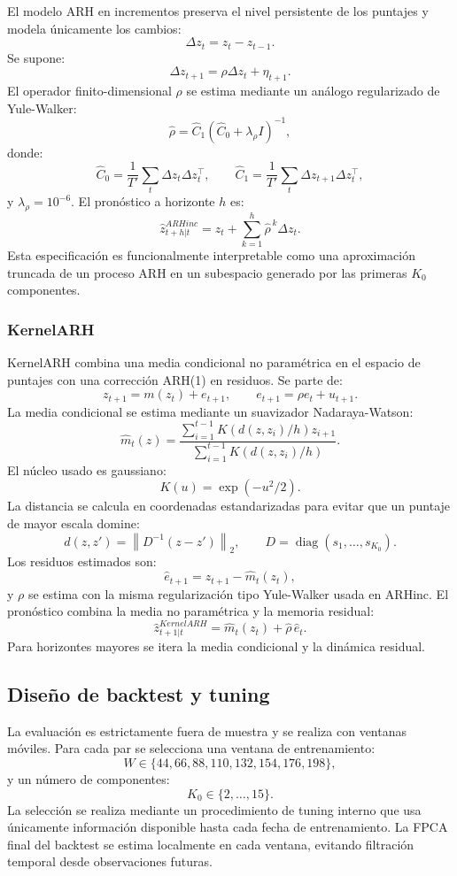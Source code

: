 \documentclass[a4paper,11pt]{article}
\newcommand{\norm}[1]{\left\lVert #1 \right\rVert}
\begin{document}
El modelo ARH en incrementos preserva el nivel persistente de los puntajes y modela únicamente los cambios:
\[
  \Delta z_t=z_t-z_{t-1}.
\]
Se supone:
\[
  \Delta z_{t+1}=\rho \Delta z_t+\eta_{t+1}.
\]
El operador finito-dimensional \(\rho\) se estima mediante un análogo regularizado de Yule-Walker:
\[
  \widehat\rho=\widehat C_1(\widehat C_0+\lambda_\rho I)^{-1},
\]
donde:
\[
  \widehat C_0=\frac{1}{T'}\sum_t \Delta z_t\Delta z_t^\top,
  \qquad
  \widehat C_1=\frac{1}{T'}\sum_t \Delta z_{t+1}\Delta z_t^\top,
\]
y \(\lambda_\rho=10^{-6}\). El pronóstico a horizonte \(h\) es:
\[
  \widehat z_{t+h|t}^{ARHinc}
  =
  z_t+\sum_{k=1}^{h}\widehat\rho^{\,k}\Delta z_t.
\]
Esta especificación es funcionalmente interpretable como una aproximación truncada de un proceso ARH en un subespacio generado por las primeras \(K_0\) componentes.

\subsubsection{KernelARH}

KernelARH combina una media condicional no paramétrica en el espacio de puntajes con una corrección ARH(1) en residuos. Se parte de:
\[
  z_{t+1}=m(z_t)+e_{t+1},
  \qquad
  e_{t+1}=\rho e_t+u_{t+1}.
\]
La media condicional se estima mediante un suavizador Nadaraya-Watson:
\[
  \widehat m_t(z)
  =
  \frac{\sum_{i=1}^{t-1}K(d(z,z_i)/h)z_{i+1}}
       {\sum_{i=1}^{t-1}K(d(z,z_i)/h)}.
\]
El núcleo usado es gaussiano:
\[
  K(u)=\exp(-u^2/2).
\]
La distancia se calcula en coordenadas estandarizadas para evitar que un puntaje de mayor escala domine:
\[
  d(z,z')=\norm{D^{-1}(z-z')}_2,
  \qquad
  D=\operatorname{diag}(s_1,\ldots,s_{K_0}).
\]
Los residuos estimados son:
\[
  \widehat e_{t+1}=z_{t+1}-\widehat m_t(z_t),
\]
y \(\rho\) se estima con la misma regularización tipo Yule-Walker usada en ARHinc. El pronóstico combina la media no paramétrica y la memoria residual:
\[
  \widehat z_{t+1|t}^{KernelARH}
  =
  \widehat m_t(z_t)+\widehat\rho\,\widehat e_t.
\]
Para horizontes mayores se itera la media condicional y la dinámica residual.

\subsection{Diseño de backtest y tuning}

La evaluación es estrictamente fuera de muestra y se realiza con ventanas móviles. Para cada par se selecciona una ventana de entrenamiento:
\[
  W\in\{44,66,88,110,132,154,176,198\},
\]
y un número de componentes:
\[
  K_0\in\{2,\ldots,15\}.
\]
La selección se realiza mediante un procedimiento de tuning interno que usa únicamente información disponible hasta cada fecha de entrenamiento. La FPCA final del backtest se estima localmente en cada ventana, evitando filtración temporal desde observaciones futuras.
\end{document}
